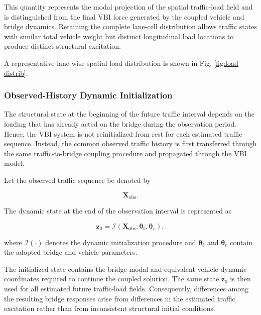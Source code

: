\documentclass[journal]{IEEEtran}
\begin{document}
This quantity represents the modal projection of the spatial traffic-load field and is distinguished from the final VBI force generated by the coupled vehicle and bridge dynamics. Retaining the complete lane-cell distribution allows traffic states with similar total vehicle weight but distinct longitudinal load locations to produce distinct structural excitation.

A representative lane-wise spatial load distribution is shown in Fig. \ref{fig:load distrib}.


\subsubsection{Observed-History Dynamic Initialization}

The structural state at the beginning of the future traffic interval depends on the loading that has already acted on the bridge during the observation period. Hence, the VBI system is not reinitialized from rest for each estimated traffic sequence. Instead, the common observed traffic history is first transferred through the same traffic-to-bridge coupling procedure and propagated through the VBI model.

Let the observed traffic sequence be denoted by

\begin{equation}
\mathbf{X}_{\mathrm{obs}}.
\end{equation}

The dynamic state at the end of the observation interval is represented as

\begin{equation}
\mathbf{z}_{0}
=
\mathcal{I}
\left(
\mathbf{X}_{\mathrm{obs}};
\boldsymbol{\theta}_{b},
\boldsymbol{\theta}_{v}
\right),
\end{equation}

where $\mathcal{I}(\cdot)$ denotes the dynamic initialization procedure and $\boldsymbol{\theta}_{b}$ and $\boldsymbol{\theta}_{v}$ contain the adopted bridge and vehicle parameters.

The initialized state contains the bridge modal and equivalent vehicle dynamic coordinates required to continue the coupled solution. The same state $\mathbf{z}_{0}$ is then used for all estimated future traffic-load fields. Consequently, differences among the resulting bridge responses arise from differences in the estimated traffic excitation rather than from inconsistent structural initial conditions.
\end{document}
